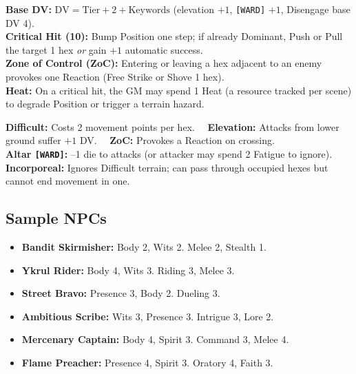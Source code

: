 \begin{tcolorbox}[title=Miniatures Mode --- Speed Defaults, colback=white!98!gray, colframe=black!80!gray,breakable]
\textbf{Base DV:} $\mathrm{DV}=\mathrm{Tier}+2+\text{Keywords}$ (elevation \(+1\), \texttt{[WARD]} \(+1\), Disengage base DV 4).\\
\textbf{Critical Hit (10):} Bump Position one step; if already Dominant, Push or Pull the target 1 hex \emph{or} gain \(+1\) automatic success.\\
\textbf{Zone of Control (ZoC):} Entering or leaving a hex adjacent to an enemy provokes one Reaction (Free Strike or Shove 1 hex).\\
\textbf{Heat:} On a critical hit, the GM may spend 1 Heat (a resource tracked per scene) to degrade Position or trigger a terrain hazard.
\end{tcolorbox}

\begin{tcolorbox}[title=Hex Keywords, colback=white!98!gray, colframe=black!80!gray,breakable]
\textbf{Difficult:} Costs 2 movement points per hex. 
\textbf{Elevation:} Attacks from lower ground suffer \(+1\) DV. 
\textbf{ZoC:} Provokes a Reaction on crossing.\\
\textbf{Altar \texttt{[WARD]}:} --1 die to attacks (or attacker may spend 2 Fatigue to ignore).\\
\textbf{Incorporeal:} Ignores Difficult terrain; can pass through occupied hexes but cannot end movement in one.
\end{tcolorbox}

\subsection*{Sample NPCs}
\label{sec:sample-npcs}

\begin{tcolorbox}[title=Encounters (Tier I--II), colback=white!97!gray,breakable]
\begin{itemize}
  \item \textbf{Bandit Skirmisher:} Body 2, Wits 2. Melee 2, Stealth 1.
  \item \textbf{Ykrul Rider:} Body 4, Wits 3. Riding 3, Melee 3.
  \item \textbf{Street Bravo:} Presence 3, Body 2. Dueling 3.
\end{itemize}
\end{tcolorbox}

\begin{tcolorbox}[title=Foils \& Rivals (Tier II--III), colback=white!97!gray,breakable]
\begin{itemize}
  \item \textbf{Ambitious Scribe:} Wits 3, Presence 3. Intrigue 3, Lore 2.
  \item \textbf{Mercenary Captain:} Body 4, Spirit 3. Command 3, Melee 4.
  \item \textbf{Flame Preacher:} Presence 4, Spirit 3. Oratory 4, Faith 3.
\end{itemize}
\end{tcolorbox}

